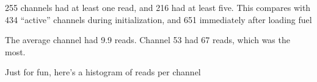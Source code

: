 255 channels had at least one read, and 216 had at least five.  
This compares with 434 ``active'' channels during initialization, and 651 immediately after loading fuel

The average channel had 9.9 reads. 
Channel 53 had 67 reads, which was the most.

Just for fun, here's a histogram of reads per channel\\
